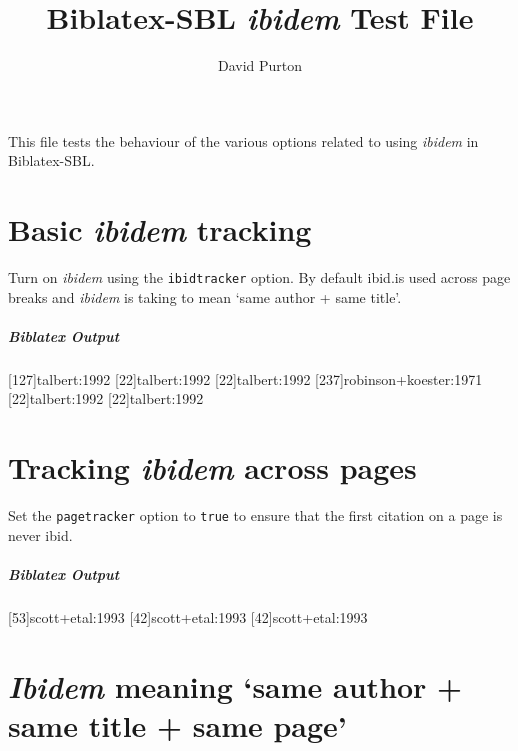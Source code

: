 \documentclass{article}
\newenvironment{biboutput}{%
  \subparagraph{Biblatex Output}
}{\color{black}}
\begin{document}
\title{Biblatex-SBL \emph{ibidem} Test File}
\author{David Purton}
\maketitle

This file tests the behaviour of the various options related to using
\emph{ibidem} in Biblatex-SBL.

\section*{Basic \emph{ibidem} tracking}

Turn on \emph{ibidem} using the \texttt{ibidtracker} option. By default
ibid.\@ is used across page breaks and \emph{ibidem} is taking to mean ‘same
author + same title’.


\begin{biboutput}
  [127]{talbert:1992}
  [22]{talbert:1992}
  [22]{talbert:1992}
  [237]{robinson+koester:1971}
  [22]{talbert:1992}
  \clearpage
  [22]{talbert:1992}
\end{biboutput}

\section*{Tracking \emph{ibidem} across pages}

Set the \texttt{pagetracker} option to \texttt{true} to ensure that the first
citation on a page is never ibid. 


\begin{biboutput}
  [53]{scott+etal:1993}
  [42]{scott+etal:1993}
  \clearpage
  [42]{scott+etal:1993}
\end{biboutput}

\section*{\emph{Ibidem} meaning ‘same author + same title + same page’}
\end{document}
